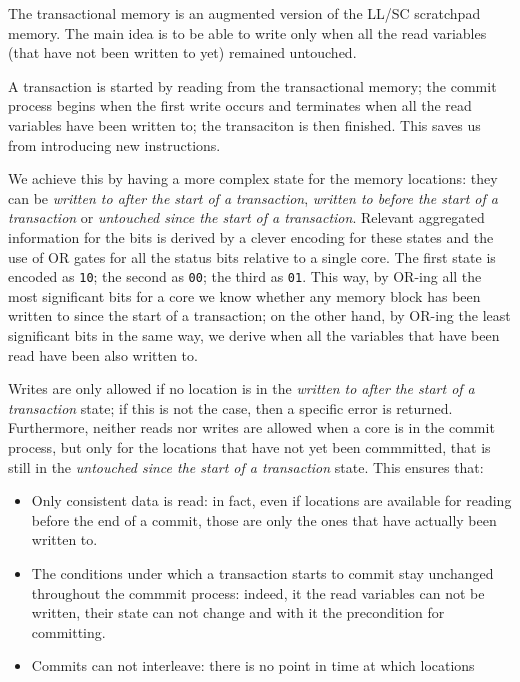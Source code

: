 The transactional memory is an augmented version of the LL/SC scratchpad memory.
The main idea is to be able to write only when all the read variables (that have
not been written to yet) remained untouched.

A transaction is started by reading from the transactional memory; the commit
process begins when the first write occurs and terminates when all the read
variables have been written to; the transaciton is then finished.
This saves us from introducing new instructions.

We achieve this by having a more complex state for the memory locations: they
can be \textit{written to after the start of a transaction},
\textit{written to before the start of a transaction} or
\textit{untouched since the start of a transaction}. Relevant aggregated
information for the bits is derived by a clever encoding for these states and
the use of OR gates for all the status bits relative to a single core.
The first state is encoded as \texttt{10}; the second as \texttt{00}; the third
as \texttt{01}. This way, by OR-ing all the most significant bits for a core
we know whether any memory block has been written to since the start of a transaction;
on the other hand, by OR-ing the least significant bits in the same way, we
derive when all the variables that have been read have been also written to.

Writes are only allowed if no location is in the \textit{written to after the start of a transaction}
state; if this is not the case, then a specific error is returned.
Furthermore, neither reads nor writes are allowed when a core is in the commit
process, but only for the locations that have not yet been commmitted, that is
still in the \textit{untouched since the start of a transaction} state. This
ensures that:

\begin{itemize}
    \item Only consistent data is read: in fact, even if locations are available
        for reading before the end of a commit, those are only the ones that have
        actually been written to.
    \item The conditions under which a transaction starts to commit stay unchanged
        throughout the commmit process: indeed, it the read variables can not
        be written, their state can not change and with it the precondition for
        committing.
    \item Commits can not interleave: there is no point in time at which locations
        
\end{itemize}

